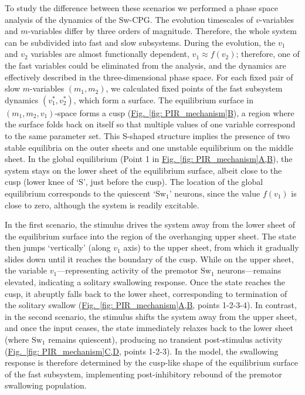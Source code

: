 \documentclass[pdflatex,sn-mathphys-ay]{sn-jnl}%
\renewcommand{\figureautorefname}{Fig.}
\newcommand{\Figref}[2][]{\hyperref[#2]{\figureautorefname~\ref*{#2}#1}}
\theoremstyle{thmstyleone}%
\theoremstyle{thmstyletwo}%
\theoremstyle{thmstylethree}%
\begin{document}
To study the difference between these scenarios we performed a phase space analysis of the dynamics of the Sw-CPG. The evolution timescales of $v$-variables and $m$-variables differ by three orders of magnitude. Therefore, the whole system can be subdivided into fast and slow subsystems. During the evolution, the $v_1$ and $v_2$ variables are almost functionally dependent, $v_1 \approx f(v_2)$; therefore, one of the fast variables could be eliminated from the analysis, and the dynamics are effectively described in the three-dimensional phase space.
For each fixed pair of slow $m$-variables $(m_1,m_2)$, we calculated fixed points of the fast subsystem dynamics $(v_1^*,v_2^*)$, which form a surface. The equilibrium surface in $(m_1,m_2,v_1)$-space forms a cusp (\Figref[B]{fig: PIR_mechanism}), a region where the surface folds back on itself so that multiple values of one variable correspond to the same parameter set. This S-shaped structure implies the presence of two stable equilibria on the outer sheets and one unstable equilibrium on the middle sheet.
In the global equilibrium (Point 1 in \Figref[A,B]{fig: PIR_mechanism}), the system stays on the lower sheet of the equilibrium surface, albeit close to the cusp (lower knee of `S', just before the cusp). The location of the global equilibrium corresponds to the quiescent `$\text{Sw}_1$’ neurons, since the value $f(v_1)$ is close to zero, although the system is readily excitable.

In the first scenario, the stimulus drives the system away from the lower sheet of the equilibrium surface into the region of the overhanging upper sheet. The state then jumps `vertically' (along $v_1$ axis) to the upper sheet, from which it gradually slides down until it reaches the boundary of the cusp. While on the upper sheet, the variable $v_1$---representing activity of the premotor $\text{Sw}_1$ neurons---remains elevated, indicating a solitary swallowing response. Once the state reaches the cusp, it abruptly falls back to the lower sheet, corresponding to termination of the solitary swallow (\Figref[A,B]{fig: PIR_mechanism}, points 1-2-3-4). In contrast, in the second scenario, the stimulus shifts the system away from the upper sheet, and once the input ceases, the state immediately relaxes back to the lower sheet (where $\text{Sw}_1$ remains quiescent), producing no transient post-stimulus activity (\Figref[C,D]{fig: PIR_mechanism}, points 1-2-3).
In the model, the swallowing response is therefore determined by the cusp-like shape of the equilibrium surface of the fast subsystem, implementing post-inhibitory rebound of the premotor swallowing population.
\end{document}
